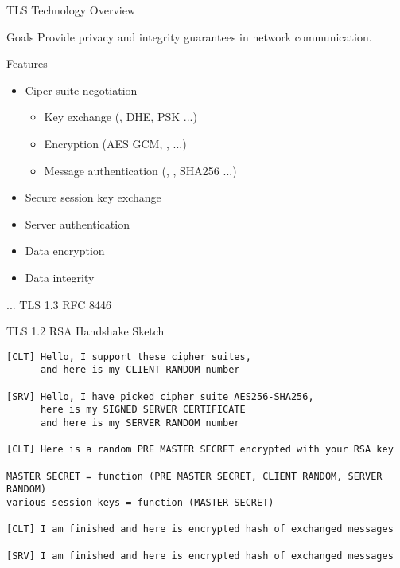 \begin{frame}{TLS Technology Overview}
    \begin{block}{Goals}
        Provide privacy and integrity guarantees in network communication.
    \end{block}

    \bigskip

    \begin{block}{Features}
        \begin{itemize}
            \item Ciper suite negotiation
            \begin{itemize}
                \item Key exchange (, DHE, PSK ...)
                \item Encryption (AES GCM, ,  ...)
                \item Message authentication (, , SHA256 ...)
            \end{itemize}
            \item Secure session key exchange
            \item Server authentication
            \item Data encryption
            \item Data integrity
        \end{itemize}
    \end{block}

    \hfill ... TLS 1.3 RFC 8446
\end{frame}


\begin{frame}[fragile]{TLS 1.2 RSA Handshake Sketch}
\begin{lstlisting}[style=mini]
[CLT] Hello, I support these cipher suites,
      and here is my CLIENT RANDOM number

[SRV] Hello, I have picked cipher suite AES256-SHA256,
      here is my SIGNED SERVER CERTIFICATE
      and here is my SERVER RANDOM number

[CLT] Here is a random PRE MASTER SECRET encrypted with your RSA key

MASTER SECRET = function (PRE MASTER SECRET, CLIENT RANDOM, SERVER RANDOM)
various session keys = function (MASTER SECRET)

[CLT] I am finished and here is encrypted hash of exchanged messages

[SRV] I am finished and here is encrypted hash of exchanged messages
\end{lstlisting}
\end{frame}


